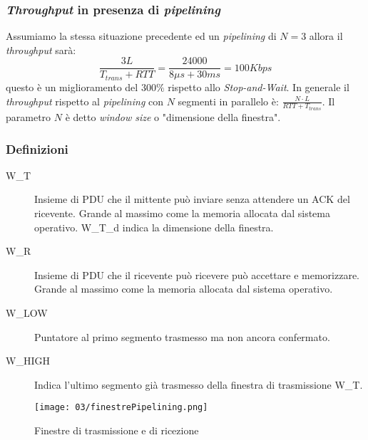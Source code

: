         \subsubsection{\textit{Throughput} in presenza di \textit{pipelining}}
            Assumiamo la stessa situazione precedente ed un \textit{pipelining} di $ N = 3 $ allora il \textit{throughput} sarà: $$ \frac{3L}{T_{trans}+RTT} = \frac{24000}{8\mu s + 30ms} = 100 Kbps $$questo è un miglioramento del $ 300\% $ rispetto allo \textit{Stop-and-Wait}. In generale il \textit{throughput} rispetto al \textit{pipelining} con $ N $ segmenti in parallelo è: $ \frac{N \cdot L}{RTT + T_{trans}} $. Il parametro $ N $ è detto \textit{window size} o "dimensione della finestra".
        \subsubsection{Definizioni}
            \begin{description}
                \item[\acrfull*{W_T}] Insieme di \Acrshort*{PDU} che il mittente può inviare senza attendere un \Acrshort*{ACK} del ricevente.
                    \subitem Grande al massimo come la memoria allocata dal sistema operativo.
                    \subitem \Acrshort*{W_T_d} indica la dimensione della finestra.
                \item[\acrfull*{W_R}] Insieme di \Acrshort*{PDU} che il ricevente può ricevere può accettare e memorizzare.
                    \subitem Grande al massimo come la memoria allocata dal sistema operativo.
                \item[\acrfull*{W_LOW}] Puntatore al primo segmento trasmesso ma non ancora confermato.
                \item[\acrfull*{W_HIGH}] Indica l'ultimo segmento già trasmesso della finestra di trasmissione \Acrshort*{W_T}.
            \end{description}
        
        \begin{figure}[H]
            \centering
            \texttt{[image: 03/finestrePipelining.png]}
            \caption{Finestre di trasmissione e di ricezione}
        \end{figure}

